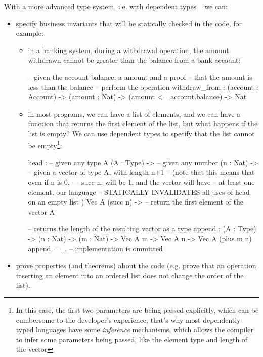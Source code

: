 \documentclass[
       embeddedlogo,
       english,
       lmodern,
       coorientadorbanca,
       noabntexcite
]{ufsc-thesis-rn46-2019}
\theoremstyle{definition}
\begin{document}
With a more advanced type system, i.e. with dependent types ~\cite{advancedtapl} we can:
\begin{itemize}
       \item specify business invariants that will be statically checked in the code, for example:
       \begin{itemize}
              \item in a banking system, during a withdrawal operation, the amount withdrawn cannot be greater than the balance from a bank account:
             \begin{piforall}
--  given the account balance, a amount and a proof
-- that the amount is less than the balance
-- perform the operation
withdraw_from :
       (account : Account) ->
       (amount : Nat) ->
       (amount <= account.balance) ->
       Nat
             \end{piforall}
             \item in most programs, we can have a list of elements, and we can have a function that returns the first element of the list, but what happens if the list is empty? We can use dependent types to specify that the list cannot be empty\footnote{In this case, the first two parameters are being passed explicitly, which can be cumbersome to the developer's experience, that's why most dependently-typed languages have some \emph{inference} mechanisms, which allows the compiler to infer some parameters being passed, like the element type and length of the vector}:
             \begin{piforall}

head :
       -- given any type A
       (A : Type) ->
       -- given any number
       (n : Nat) ->
       -- given a vector of type A, with length n+1
       -- (note that this means that even if n is 0,
       --- succ n, will be 1, and the vector will have
       -- at least one element, our language
       -- STATICALLY INVALIDATES  all uses of head on an empty list )
       Vec A (succ n) ->
       -- return the first element of the vector
       A

-- returns the length of the resulting vector as a type
append : (A : Type) -> (n : Nat) -> (m : Nat) -> Vec A m -> Vec A n -> Vec A (plus m n)
append = ... -- implementation is ommitted
             \end{piforall}
       \end{itemize}
       \item prove properties (and theorems) about the code (e.g. prove that an operation inserting an element into an ordered list does not change the order of the list).
\end{itemize}
\end{document}
